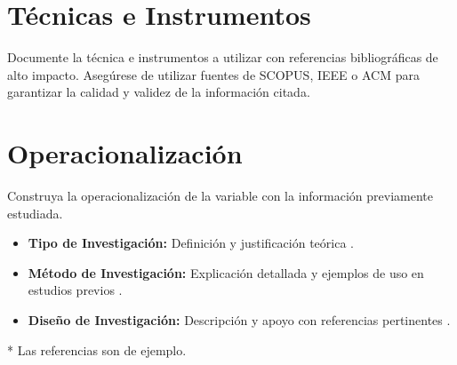 \documentclass[12pt]{article}
\begin{document}
\section{Técnicas e Instrumentos}
Documente la técnica e instrumentos a utilizar con referencias bibliográficas de alto impacto. Asegúrese de utilizar fuentes de SCOPUS, IEEE o ACM para garantizar la calidad y validez de la información citada.

\section{Operacionalización}

Construya la operacionalización de la variable con la información previamente estudiada.


\begin{itemize}
    \item \textbf{Tipo de Investigación:} Definición y justificación teórica \cite{Kadhim2020165}.
    \item \textbf{Método de Investigación:} Explicación detallada y ejemplos de uso en estudios previos \cite{Xu2022139}.
    \item \textbf{Diseño de Investigación:} Descripción y apoyo con referencias pertinentes \cite{Liang2020147}.
\end{itemize}

* Las referencias son de ejemplo.
\printbibliography
\end{document}
